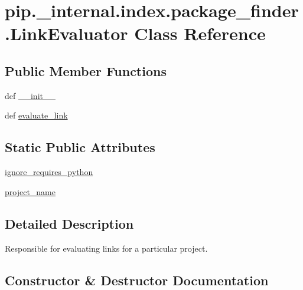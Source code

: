 \hypertarget{classpip_1_1__internal_1_1index_1_1package__finder_1_1LinkEvaluator}{}\section{pip.\+\_\+internal.\+index.\+package\+\_\+finder.\+Link\+Evaluator Class Reference}
\label{classpip_1_1__internal_1_1index_1_1package__finder_1_1LinkEvaluator}
\subsection*{Public Member Functions}
\begin{DoxyCompactItemize}
\item 
def \hyperlink{classpip_1_1__internal_1_1index_1_1package__finder_1_1LinkEvaluator_ab35851ec55ae2bbff7286c28d85a1f69}{\+\_\+\+\_\+init\+\_\+\+\_\+}
\item 
def \hyperlink{classpip_1_1__internal_1_1index_1_1package__finder_1_1LinkEvaluator_a83e2334aba35e42b685ca26c43d23999}{evaluate\+\_\+link}
\end{DoxyCompactItemize}
\subsection*{Static Public Attributes}
\begin{DoxyCompactItemize}
\item 
\hyperlink{classpip_1_1__internal_1_1index_1_1package__finder_1_1LinkEvaluator_a992128d92248999aad10cce8c8cb7e2a}{ignore\+\_\+requires\+\_\+python}
\item 
\hyperlink{classpip_1_1__internal_1_1index_1_1package__finder_1_1LinkEvaluator_a863c5807bac2d54e03b1269df84ef341}{project\+\_\+name}
\end{DoxyCompactItemize}


\subsection{Detailed Description}
\begin{DoxyVerb}Responsible for evaluating links for a particular project.
\end{DoxyVerb}
 

\subsection{Constructor \& Destructor Documentation}
\mbox{\label{classpip_1_1__internal_1_1index_1_1package__finder_1_1LinkEvaluator_ab35851ec55ae2bbff7286c28d85a1f69}} 

